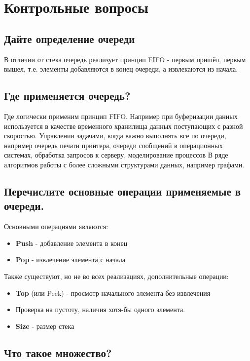 \documentclass[a4paper,12pt]{article}
\begin{document}
	\newpage
	\section{Контрольные вопросы}
	\subsection{Дайте определение очереди}
	
	В отличии от стека очередь реализует принцип FIFO - первым пришёл, первым вышел, т.е. элементы добавляются в конец очереди, а извлекаются из начала. 
	
	\subsection{Где применяется очередь?}
	
	Где логически применим принцип FIFO. Например при буферизации данных используется в качестве временного хранилища данных поступающих с разной скоростью. Управлении задачами, когда важно выполнять все по очереди, например очередь печати принтера, очереди сообщений в операционных системах, обработка запросов к серверу, моделирование процессов В ряде алгоритмов работы с более сложными структурами данных, например графами.
	
	\subsection{Перечислите основные операции применяемые в очереди.}
	
	Основными операциями являются:
	
	\begin{itemize}
		\item \textbf{Push} - добавление элемента в конец
		\item \textbf{Pop} - извлечение элемента с начала
	\end{itemize}
	
	Также существуют, но не во всех реализациях, дополнительные операции:
	
	\begin{itemize}
		\item \textbf{Top} (или Peek) - просмотр начального элемента без извлечения
		\item Проверка на пустоту, наличия хотя-бы одного элемента.
		\item \textbf{Size} - размер стека
	\end{itemize}
	
	\subsection{Что такое множество?}
	
\end{document}
